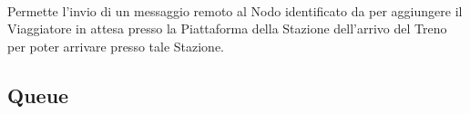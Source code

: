 \begin{description}
		\item {}\\
			
		Permette l'invio di un messaggio remoto al Nodo identificato da  per aggiungere il Viaggiatore  in attesa presso la Piattaforma  della Stazione  dell'arrivo del Treno  per poter arrivare presso tale Stazione.
		
	\end{description}
	
	\subsection{Queue}
	
